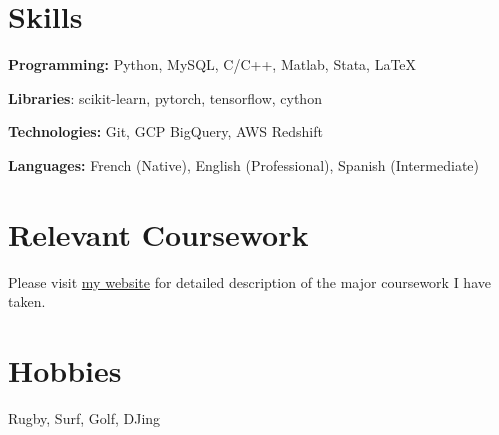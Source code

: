 \documentclass[letterpaper,11pt]{article}
\newcommand{\resumeSubHeadingListStart}{\begin{itemize}[leftmargin=0.15in, label={}]}
\newcommand{\resumeSubHeadingListEnd}{\end{itemize}}
\begin{document}
\section{Skills}
  \vspace{2pt}
  \resumeSubHeadingListStart
    \small{\item{
        \textbf{Programming:}{ Python, MySQL, C/C++, Matlab, Stata, \LaTeX} \\ \vspace{3pt}
        
        \textbf{Libraries}{: scikit-learn, pytorch, tensorflow, cython} \\ \vspace{3pt}

        \textbf{Technologies:}{ Git, GCP BigQuery, AWS Redshift} \\ \vspace{3pt}
        
        \textbf{Languages:}{ French (Native), English (Professional), Spanish (Intermediate)}
        
    }}
  \resumeSubHeadingListEnd




\section{Relevant Coursework}
  \vspace{2pt}
    \resumeSubHeadingListStart
      \small{\item{Please visit \href{https://tms-gvd.github.io}{my website} for detailed description of the major coursework I have taken.}}
    \resumeSubHeadingListEnd



\section{Hobbies}
  \resumeSubHeadingListStart
    \small{\item{Rugby, Surf, Golf, DJing}}
  \resumeSubHeadingListEnd



\end{document}
